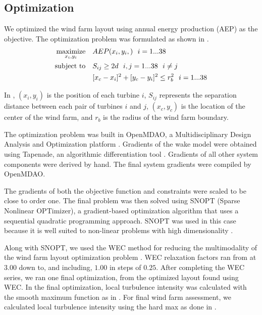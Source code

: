 \documentclass[conf]{new-aiaa}
\begin{document}
\subsection{Optimization}\label{sec:opt}

We optimized the wind farm layout using annual energy production (AEP) as the objective. The optimization problem was formulated as shown in .
%
\begin{equation}
	\label{eq:objective}
	\begin{aligned} [b]
	\underset{x_i,y_i}{\textrm{maximize}} \quad & AEP(x_i,y_i,)~~i=1...38\\
	\textrm{subject to} \quad & S_{ij} \geq 2\*d~~i,j=1...38~~i \neq j\\
	 & [x_c-x_i]^2+[y_c-y_i]^2 \leq r_{b}^2~~i=1...38\\
	\end{aligned}
\end{equation}
%
In , $(x_i,y_i)$ is the position of each turbine $i$, $S_{ij}$ represents the separation distance between each pair of turbines $i$ and $j$, $(x_c,y_c)$ is the location of the center of the wind farm, and $r_b$ is the radius of the wind farm boundary.

The optimization problem was built in OpenMDAO, a Multidisciplinary Design Analysis and Optimization platform  \cite{gray2010_OpenMDAO}. Gradients of the wake model were obtained using Tapenade, an algorithmic differentiation tool \cite{tapenade2013}. Gradients of all other system components were derived by hand. The final system gradients were compiled by OpenMDAO.

The gradients of both the objective function and constraints were scaled to be close to order one. The final problem was then solved using SNOPT (Sparse Nonlinear OPTimizer), a gradient-based optimization algorithm that uses a sequential quadratic programming approach. SNOPT was used in this case because it is well suited to non-linear problems with high dimensionality \cite{gill2005}. 

Along with SNOPT, we used the WEC method for reducing the multimodality of the wind farm layout optimization problem \cite{thomas2018-wec}. WEC relaxation factors ran from at $3.00$ down to, and including, $1.00$ in steps of $0.25$.  After completing the WEC series, we ran one final optimization, from the optimized layout found using WEC. In the final optimization, local turbulence intensity was calculated with the smooth maximum function as in . For final wind farm assessment, we calculated local turbulence intensity using the hard max as done in \cite{niayifar2016}. 
\end{document}
